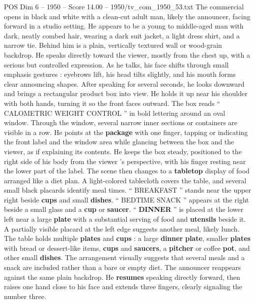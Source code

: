 \begin{textsample}{POS Dim 6 – 1950 – Score 14.00 – 1950/tv\_com\_1950\_53.txt}  \label{ex:f6_pos_010}
The commercial opens in black and white with a clean-cut adult man, likely the announcer, facing forward in a studio setting.
He appears to be a young to middle-aged man with dark, neatly combed hair, wearing a dark suit jacket, a light dress shirt, and a narrow tie.
Behind him is a plain, vertically textured wall or wood-grain backdrop.
He speaks directly toward the viewer, mostly from the chest up, with a serious but controlled expression.
As he talks, his face shifts through small emphasis gestures : eyebrows lift, his head tilts slightly, and his mouth forms clear announcing shapes.
After speaking for several seconds, he looks downward and brings a rectangular product box into view.
He holds it up near his shoulder with both hands, turning it so the front faces outward.
The box reads “ CALOMETRIC WEIGHT CONTROL ” in bold lettering around an oval window.
Through the window, several narrow inner sections or containers are visible in a row.
He points at the \textbf{package} with one finger, tapping or indicating the front label and the window area while glancing between the box and the viewer, as if explaining its contents.
He keeps the box steady, positioned to the right side of his body from the viewer ’s perspective, with his finger resting near the lower part of the label.
The scene then changes to a \textbf{tabletop} display of food arranged like a diet plan.
A light-colored tablecloth covers the table, and several small black placards identify meal times. “ BREAKFAST ” stands near the upper right beside \textbf{cups} and small \textbf{dishes}. “ BEDTIME SNACK ” appears at the right beside a small glass and a \textbf{cup} or \textbf{saucer}. “ \textbf{DINNER} ” is placed at the lower left near a large \textbf{plate} with a substantial serving of food and \textbf{utensils} beside it.
A partially visible placard at the left edge suggests another meal, likely lunch.
The table holds multiple \textbf{plates} and \textbf{cups} : a large \textbf{dinner} \textbf{plate}, smaller \textbf{plates} with bread or dessert-like items, \textbf{cups} and \textbf{saucers}, a \textbf{pitcher} or coffee \textbf{pot}, and other small \textbf{dishes}.
The arrangement visually suggests that several meals and a snack are included rather than a bare or empty diet.
The announcer reappears against the same plain backdrop.
He \textbf{resumes} speaking directly forward, then raises one hand close to his face and extends three fingers, clearly signaling the number three.

\end{textsample}
